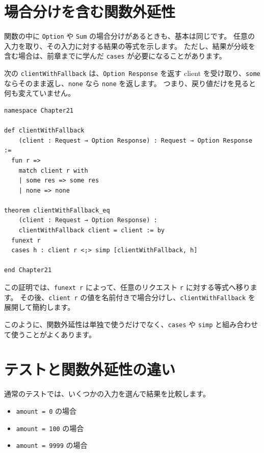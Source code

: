 \section{場合分けを含む関数外延性}

関数の中に \texttt{Option} や \texttt{Sum} の場合分けがあるときも、基本は同じです。
任意の入力を取り、その入力に対する結果の等式を示します。
ただし、結果が分岐を含む場合は、前章までに学んだ \texttt{cases} が必要になることがあります。

次の \texttt{clientWithFallback} は、\texttt{Option Response} を返す client を受け取り、\texttt{some} ならそのまま返し、\texttt{none} なら \texttt{none} を返します。
つまり、戻り値だけを見ると何も変えていません。

\begin{listing}[htbp]
\begin{verbatim}
namespace Chapter21

def clientWithFallback
    (client : Request → Option Response) : Request → Option Response :=
  fun r =>
    match client r with
    | some res => some res
    | none => none

theorem clientWithFallback_eq
    (client : Request → Option Response) :
    clientWithFallback client = client := by
  funext r
  cases h : client r <;> simp [clientWithFallback, h]

end Chapter21
\end{verbatim}
\caption{\texttt{clientWithFallback\_eq}}
\label{lst:ch21-option-wrapper}
\end{listing}

この証明では、\texttt{funext r} によって、任意のリクエスト \texttt{r} に対する等式へ移ります。
その後、\texttt{client r} の値を名前付きで場合分けし、\texttt{clientWithFallback} を展開して簡約します。

このように、関数外延性は単独で使うだけでなく、\texttt{cases} や \texttt{simp} と組み合わせて使うことがよくあります。

\section{テストと関数外延性の違い}

通常のテストでは、いくつかの入力を選んで結果を比較します。

\begin{itemize}
\item \texttt{amount = 0} の場合
\item \texttt{amount = 100} の場合
\item \texttt{amount = 9999} の場合
\end{itemize}

